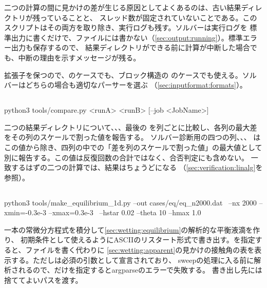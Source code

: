 二つの計算の間に見かけの差が生じる原因としてよくあるのは、古い結果ディレクトリが残っていることと、
スレッド数が固定されていないことである。このスクリプトはその両方を取り除き、実行ログも残す。ソルバーは実行ログを
標準出力に書くだけで、ファイルには書かない（\cref{sec:output:running}）。標準エラー出力も保存するので、
結果ディレクトリができる前に計算が中断した場合でも、中断の理由を示すメッセージが残る。

\begin{note}[両方の入力形式に対応]
  拡張子を保つので、のケースでも、ブロック構造の
  のケースでも使える。ソルバーはどちらの場合も適切なパーサーを選ぶ
  （\cref{sec:inputformat:formats}）。
\end{note}

\subsection{}

\begin{shell}
python3 tools/compare.py <runA> <runB> [--job <JobName>]
\end{shell}

二つの結果ディレクトリについて、、、最後の
を列ごとに比較し、各列の最大差をその列のスケールで割った値を報告する。
ソルバー診断用の四つの列、、、
はこの値から除き、四列の中での「差を列のスケールで割った値」の最大値として
別に報告する。この値は反復回数の合計ではなく、合否判定にも含めない。
一致するはずの二つの計算では、結果はちょうどになる
（\cref{sec:verification:linalg}を参照）。

\subsection{}

\begin{shell}
python3 tools/make_equilibrium_1d.py --out cases/eq/eq_n2000.dat \
        --nx 2000 --xmin=-0.3e-3 --xmax=0.3e-3 \
        --hstar 0.02 --theta 10 --hmax 1.0
\end{shell}

一本の常微分方程式を積分して\cref{sec:wetting:equilibrium}の解析的な平衡液滴を作り、
初期条件として使えるようにASCIIのリスタート形式で書き出す。を指定すると、ファイルを書く代わりに
\cref{sec:wetting:apparent}の見かけの接触角の表を表示する。ただし\code{--out}は必須の引数として宣言されており、
sweepの処理に入る前に解析されるので、\code{--sweep}だけを指定するとargparseのエラーで失敗する。
書き出し先には捨ててよいパスを渡す。

